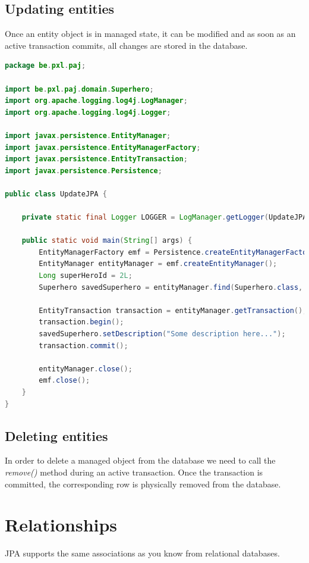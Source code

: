 \subsection{Updating entities}


Once an entity object is in managed state,  it can be modified and as soon as an active transaction commits, all changes are stored in the database.

\begin{lstlisting}[frame=single,language=java]
package be.pxl.paj;

import be.pxl.paj.domain.Superhero;
import org.apache.logging.log4j.LogManager;
import org.apache.logging.log4j.Logger;

import javax.persistence.EntityManager;
import javax.persistence.EntityManagerFactory;
import javax.persistence.EntityTransaction;
import javax.persistence.Persistence;

public class UpdateJPA {

	private static final Logger LOGGER = LogManager.getLogger(UpdateJPA.class);

	public static void main(String[] args) {
		EntityManagerFactory emf = Persistence.createEntityManagerFactory("musicdb_pu");
		EntityManager entityManager = emf.createEntityManager();
		Long superHeroId = 2L;
		Superhero savedSuperhero = entityManager.find(Superhero.class, superHeroId);

		EntityTransaction transaction = entityManager.getTransaction();
		transaction.begin();
		savedSuperhero.setDescription("Some description here...");
		transaction.commit();

		entityManager.close();
		emf.close();
	}
}
\end{lstlisting}

\subsection{Deleting entities}

In order to delete a managed object from the database we need to call the \textit{remove()} method during an active transaction. Once the transaction is committed, the corresponding row is physically removed from the database.


\section{Relationships}

JPA supports the same associations as you know from relational databases.

